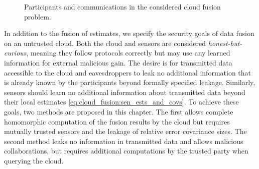\begin{figure}[htbp]
    \centering
    \caption{Participants and communications in the considered cloud fusion problem.}
    \label{fig:cloud_fusion:problem_layout}
\end{figure}

In addition to the fusion of estimates, we specify the security goals of data fusion on an untrusted cloud. Both the cloud and sensors are considered \textit{honest-but-curious}, meaning they follow protocols correctly but may use any learned information for external malicious gain. The desire is for transmitted data accessible to the cloud and eavesdroppers to leak no additional information that is already known by the participants beyond formally specified leakage. Similarly, sensors should learn no additional information about transmitted data beyond their local estimates \eqref{eq:cloud_fusion:sen_ests_and_covs}. To achieve these goals, two methods are proposed in this chapter. The first allows complete homomorphic computation of the fusion results by the cloud but requires mutually trusted sensors and the leakage of relative error covariance sizes. The second method leaks no information in transmitted data and allows malicious collaborations, but requires additional computations by the trusted party when querying the cloud.


